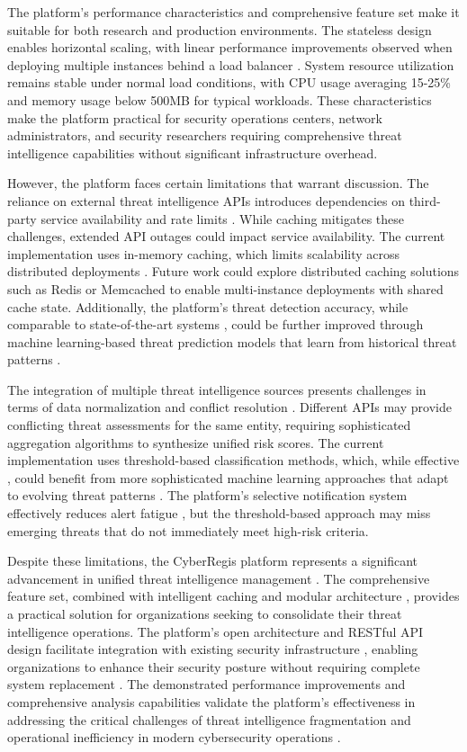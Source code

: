 \documentclass[conference]{IEEEtran}
\begin{document}
The platform's performance characteristics and comprehensive feature set make it suitable for both research and production environments. The stateless design enables horizontal scaling, with linear performance improvements observed when deploying multiple instances behind a load balancer \cite{b7}. System resource utilization remains stable under normal load conditions, with CPU usage averaging 15-25\% and memory usage below 500MB for typical workloads. These characteristics make the platform practical for security operations centers, network administrators, and security researchers requiring comprehensive threat intelligence capabilities without significant infrastructure overhead.

However, the platform faces certain limitations that warrant discussion. The reliance on external threat intelligence APIs introduces dependencies on third-party service availability and rate limits \cite{b7}. While caching mitigates these challenges, extended API outages could impact service availability. The current implementation uses in-memory caching, which limits scalability across distributed deployments \cite{b17}. Future work could explore distributed caching solutions such as Redis or Memcached to enable multi-instance deployments with shared cache state. Additionally, the platform's threat detection accuracy, while comparable to state-of-the-art systems \cite{b13,b14}, could be further improved through machine learning-based threat prediction models that learn from historical threat patterns \cite{b1,b13}.

The integration of multiple threat intelligence sources presents challenges in terms of data normalization and conflict resolution \cite{b4,b12}. Different APIs may provide conflicting threat assessments for the same entity, requiring sophisticated aggregation algorithms to synthesize unified risk scores. The current implementation uses threshold-based classification methods, which, while effective \cite{b13}, could benefit from more sophisticated machine learning approaches that adapt to evolving threat patterns \cite{b1,b13}. The platform's selective notification system effectively reduces alert fatigue \cite{b2}, but the threshold-based approach may miss emerging threats that do not immediately meet high-risk criteria.

Despite these limitations, the CyberRegis platform represents a significant advancement in unified threat intelligence management \cite{b1}. The comprehensive feature set, combined with intelligent caching and modular architecture \cite{b19,b20}, provides a practical solution for organizations seeking to consolidate their threat intelligence operations. The platform's open architecture and RESTful API design facilitate integration with existing security infrastructure \cite{b7}, enabling organizations to enhance their security posture without requiring complete system replacement \cite{b9}. The demonstrated performance improvements and comprehensive analysis capabilities validate the platform's effectiveness in addressing the critical challenges of threat intelligence fragmentation and operational inefficiency in modern cybersecurity operations \cite{b1,b2}.
\end{document}
